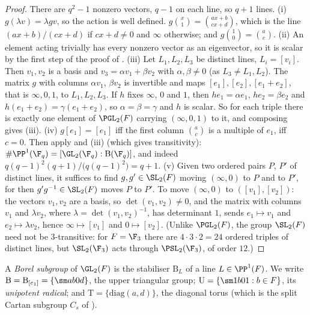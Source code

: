 \begin{proof}
There are $q^2-1$ nonzero vectors, $q-1$ on each line, so $q+1$ lines. (i) $g(\lambda v)=\lambda gv$, so the action is well defined. $g\binom x1=\binom{ax+b}{cx+d}$,
which is the line $(ax+b)/(cx+d)$ if $cx+d\ne0$ and $\infty$ otherwise; and $g\binom10=\binom ac$. (ii) An element acting trivially has every nonzero vector
as an eigenvector, so it is scalar by the first step of the proof of . (iii) Let $L_1,L_2,L_3$ be distinct lines, $L_i=[v_i]$. Then
$v_1,v_2$ is a basis and $v_3=\alpha v_1+\beta v_2$ with $\alpha,\beta\ne0$ (as $L_3\ne L_1,L_2$). The matrix $g$ with columns $\alpha v_1$, $\beta v_2$ is invertible and
maps $[e_1],[e_2],[e_1+e_2]$, that is $\infty,0,1$, to $L_1,L_2,L_3$. If $h$ fixes $\infty$, $0$ and $1$, then $he_1=\alpha e_1$, $he_2=\beta e_2$ and
$h(e_1+e_2)=\gamma(e_1+e_2)$, so $\alpha=\beta=\gamma$ and $h$ is scalar. So for each triple there is exactly one element of $\PGL_2(F)$ carrying $(\infty,0,1)$ to it, and
composing gives (iii). (iv) $g[e_1]=[e_1]$ iff the first column $\binom ac$ is a multiple of $e_1$, iff $c=0$. Then apply  and (iii)
(which gives transitivity): $\#\PP^1(\F_q)=[\GL_2(\F_q):\mathrm B(\F_q)]$, and indeed $q(q-1)^2(q+1)/\bigl(q(q-1)^2\bigr)=q+1$. (v) Given two ordered pairs $P$, $P'$ of
distinct lines, it suffices to find $g,g'\in\SL_2(F)$ moving $(\infty,0)$ to $P$ and to $P'$, for then $g'g^{-1}\in\SL_2(F)$ moves $P$ to $P'$. To move $(\infty,0)$ to
$([v_1],[v_2])$: the vectors $v_1,v_2$ are a basis, so $\det(v_1,v_2)\ne0$, and the matrix with columns $v_1$ and $\lambda v_2$, where $\lambda=\det(v_1,v_2)^{-1}$, has
determinant $1$, sends $e_1\mapsto v_1$ and $e_2\mapsto\lambda v_2$, hence $\infty\mapsto[v_1]$ and $0\mapsto[v_2]$. (Unlike $\PGL_2(F)$, the group $\SL_2(F)$ need not be
$3$-transitive: for $F=\F_3$ there are $4\cdot3\cdot2=24$ ordered triples of distinct lines, but $\SL_2(\F_3)$ acts through $\PSL_2(\F_3)$, of order $12$.)
\end{proof}

\begin{definition}\label{def:groups:borel}
A \emph{Borel subgroup} of $\GL_2(F)$ is the stabiliser $\mathrm B_L$ of a line $L\in\PP^1(F)$. We write $\mathrm B=\mathrm B_{[e_1]}=\{\sm ab0d\}$, the upper triangular
group; $\mathrm U=\{\sm1b01:b\in F\}$, its \emph{unipotent radical}; and $\mathrm T=\{\mathrm{diag}(a,d)\}$, the diagonal torus (which is the split Cartan subgroup $C_s$ of
).
\end{definition}

